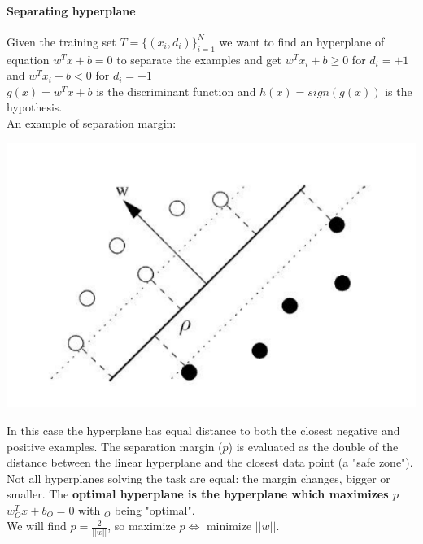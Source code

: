 \documentclass[10pt]{report}
\begin{document}
\paragraph{Separating hyperplane} Given the training set $T = \{(x_i, d_i)\}_{i=1}^N$ we want to find an hyperplane of equation $w^Tx + b = 0$ to separate the examples and get $w^Tx_i + b \geq 0$ for $d_i = +1$ and $w^Tx_i + b < 0$ for $d_i = -1$\\
$g(x) = w^Tx + b$ is the discriminant function and $h(x) = sign(g(x))$ is the hypothesis.\\
An example of separation margin:
\begin{center}
	\includegraphics[scale=0.5]{18.png}
\end{center}
In this case the hyperplane has equal distance to both the closest negative and positive examples. The separation margin ($p$) is evaluated as the double of the distance between the linear hyperplane and the closest data point (a "safe zone"). Not all hyperplanes solving the task are equal: the margin changes, bigger or smaller. The \textbf{optimal hyperplane is the hyperplane which maximizes $p$} $w_O^Tx + b_O = 0$ with $_O$ being "optimal".\\
We will find $p = \frac{2}{||w||}$, so maximize $p\Leftrightarrow$ minimize $||w||$.
\end{document}
